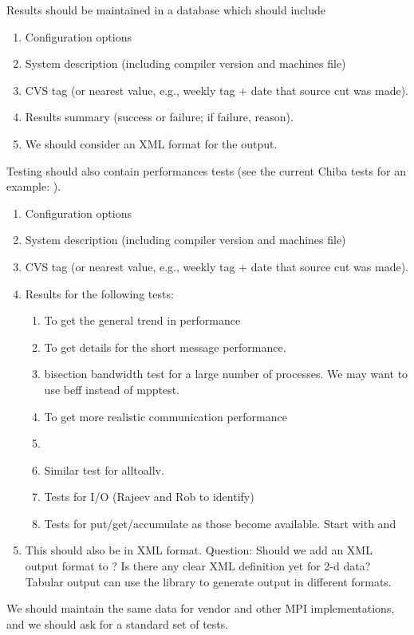 \documentclass{article}
\begin{document}
Results should be maintained in a database which should include
\begin{enumerate}
\item Configuration options
\item System description (including compiler version and machines file)
\item CVS tag (or nearest value, e.g., weekly tag + date that source
cut was made).
\item Results summary (success or failure; if failure, reason).
\item We should consider an XML format for the output.
\end{enumerate}

Testing should also contain performances tests (see the current Chiba
tests for an example: ).
\begin{enumerate}
\item Configuration options
\item System description (including compiler version and machines file)
\item CVS tag (or nearest value, e.g., weekly tag + date that source
cut was made).
\item Results for the following tests:
    \begin{enumerate}
    \item {} To get the general trend in performance
    \item {} To get details for the short message
performance. 
    \item bisection bandwidth test for a large number of processes.
    We may want to use beff instead of mpptest.
    \item {} To get more
    realistic communication performance
    \item {} 
    \item Similar test for alltoallv. 
    \item Tests for I/O (Rajeev and Rob to identify)
    \item Tests for put/get/accumulate as those become available.
    Start with  and 
    \end{enumerate}
\item This should also be in XML format.
    Question: Should we add an XML output format to ?
Is there any clear XML definition yet for 2-d data?
Tabular output can use the  library to generate output in
different formats.


\end{enumerate}
We should maintain the same data for vendor and other MPI
implementations, and we should ask for a standard set of tests.  
\end{document}
